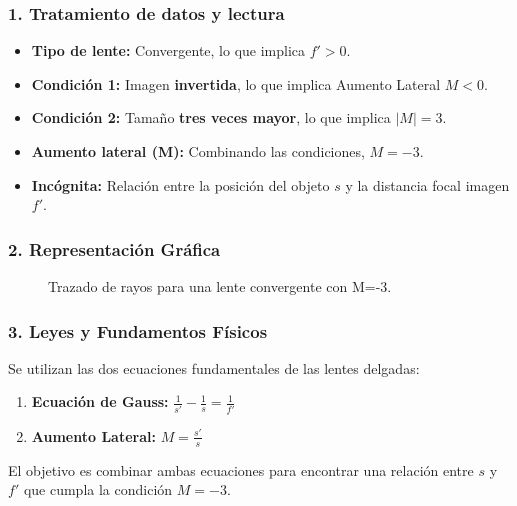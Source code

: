 \subsubsection*{1. Tratamiento de datos y lectura}
\begin{itemize}
    \item \textbf{Tipo de lente:} Convergente, lo que implica $f' > 0$.
    \item \textbf{Condición 1:} Imagen \textbf{invertida}, lo que implica Aumento Lateral $M < 0$.
    \item \textbf{Condición 2:} Tamaño \textbf{tres veces mayor}, lo que implica $|M|=3$.
    \item \textbf{Aumento lateral (M):} Combinando las condiciones, $M = -3$.
    \item \textbf{Incógnita:} Relación entre la posición del objeto $s$ y la distancia focal imagen $f'$.
\end{itemize}

\subsubsection*{2. Representación Gráfica}
\begin{figure}[H]
    \centering
    \caption{Trazado de rayos para una lente convergente con M=-3.}
\end{figure}

\subsubsection*{3. Leyes y Fundamentos Físicos}
Se utilizan las dos ecuaciones fundamentales de las lentes delgadas:
\begin{enumerate}
    \item \textbf{Ecuación de Gauss:} $\frac{1}{s'} - \frac{1}{s} = \frac{1}{f'}$
    \item \textbf{Aumento Lateral:} $M = \frac{s'}{s}$
\end{enumerate}
El objetivo es combinar ambas ecuaciones para encontrar una relación entre $s$ y $f'$ que cumpla la condición $M=-3$.

